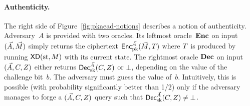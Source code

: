 
\paragraph{Authenticity. } 
The right side of Figure~\ref{fig:pkaead-notions} describes a notion of authenticity.  Adversary~$A$ is provided with two oracles.  Its leftmost oracle~$\textbf{Enc}$ on input $(\vec{A},\vec{M})$ simply returns the ciphertext ${\mathsf{Enc}}_{\mathrm{pk}}^{\vec{A}}(\vec{M},T)$ where $T$ is produced by running $\mathsf{XD}(\mathrm{st},M)$ with its current state.  The rightmost oracle $\textbf{Dec}$ on input $(\vec{A},C,Z)$ either returns ${\mathsf{Dec}}_{\mathrm{sk}}^{\vec{A}}(C,Z)$ or $\bot$, depending on the value of the challenge bit~$b$.  The adversary must guess the value of~$b$.  Intuitively, this is possible (with probability significantly better than 1/2) only if the adversary manages to forge a $(\vec{A},C,Z)$ query such that ${\mathsf{Dec}}_{\mathrm{sk}}^{\vec{A}}(C,Z) \neq \bot$.  


